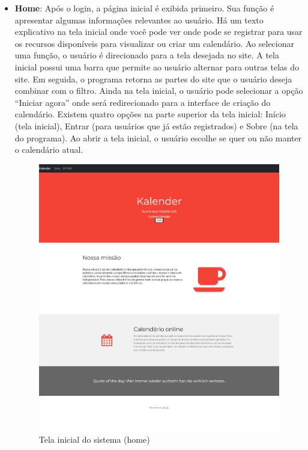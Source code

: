 \begin{itemize}
  \item \textbf{Home}: Após o login, a página inicial é exibida primeiro. Sua função é apresentar algumas informações relevantes ao usuário.
  Há um texto explicativo na tela inicial onde você pode ver onde pode se registrar para usar os recursos disponíveis para visualizar ou criar um calendário. Ao selecionar uma função, o usuário é direcionado para a tela desejada no site. A tela inicial possui uma barra que permite ao usuário alternar para outras telas do site. Em seguida, o programa retorna as partes do site que o usuário deseja combinar com o filtro. Ainda na tela inicial, o usuário pode selecionar a opção “Iniciar agora” onde será redirecionado para a interface de criação do calendário. Existem quatro opções na parte superior da tela inicial: Início (tela inicial), Entrar (para usuários que já estão registrados) e Sobre (na tela do programa). Ao abrir a tela inicial, o usuário escolhe se quer ou não manter o calendário atual.

        \begin{figure}[H]
          \begin{center}
            \includegraphics[width=12cm]{Pictures/interface/logged.png}
            \caption{Tela inicial do sistema (home)} \label{recuperar}
          \end{center}
        \end{figure}
        \begin{lstlisting}[language=Ruby, caption=Tela inicial do sistema (home)]


\end{lstlisting}
\end{itemize}

